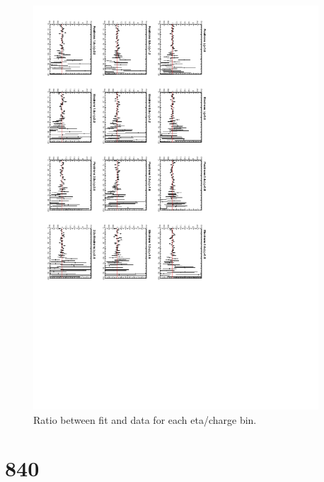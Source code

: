\begin{figure}
\begin{center}
\includegraphics[trim = 0mm 0mm 80mm 100mm, clip, angle=90, width=0.95\textwidth]{Dec22_fitratio}
     \caption{\label{fig:fit2ratio}Ratio between fit and data for each eta/charge bin.}
  \end{center}
\end{figure}


\section{\unit{840}{\invpb}}


